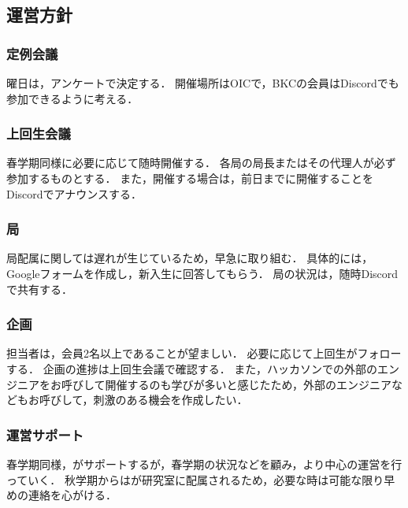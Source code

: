 \subsection*{運営方針}


\subsubsection*{定例会議}
曜日は，アンケートで決定する．
開催場所はOICで，BKCの会員はDiscordでも参加できるように考える．

\subsubsection*{上回生会議}
春学期同様に必要に応じて随時開催する．
各局の局長またはその代理人が必ず参加するものとする．
また，開催する場合は，前日までに開催することをDiscordでアナウンスする．


\subsubsection*{局}
局配属に関しては遅れが生じているため，早急に取り組む．
具体的には，Googleフォームを作成し，新入生に回答してもらう．
局の状況は，随時Discordで共有する．


\subsubsection*{企画}
担当者は，会員2名以上であることが望ましい．
必要に応じて上回生がフォローする．
企画の進捗は上回生会議で確認する．
また，ハッカソンでの外部のエンジニアをお呼びして開催するのも学びが多いと感じたため，外部のエンジニアなどもお呼びして，刺激のある機会を作成したい．

\subsubsection*{運営サポート}
春学期同様，\thirdGrade{}がサポートするが，春学期の状況などを顧み，より\secondGrade{}中心の運営を行っていく．
秋学期からは\thirdGrade{}が研究室に配属されるため，必要な時は可能な限り早めの連絡を心がける．
